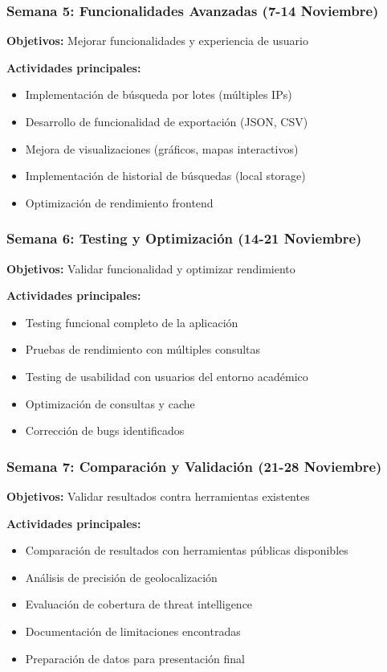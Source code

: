 \subsubsection{Semana 5: Funcionalidades Avanzadas (7-14 Noviembre)}
\textbf{Objetivos:} Mejorar funcionalidades y experiencia de usuario

\textbf{Actividades principales:}
\begin{itemize}
    \item Implementación de búsqueda por lotes (múltiples IPs)
    \item Desarrollo de funcionalidad de exportación (JSON, CSV)
    \item Mejora de visualizaciones (gráficos, mapas interactivos)
    \item Implementación de historial de búsquedas (local storage)
    \item Optimización de rendimiento frontend
\end{itemize}

\subsubsection{Semana 6: Testing y Optimización (14-21 Noviembre)}
\textbf{Objetivos:} Validar funcionalidad y optimizar rendimiento

\textbf{Actividades principales:}
\begin{itemize}
    \item Testing funcional completo de la aplicación
    \item Pruebas de rendimiento con múltiples consultas
    \item Testing de usabilidad con usuarios del entorno académico
    \item Optimización de consultas y cache
    \item Corrección de bugs identificados
\end{itemize}

\subsubsection{Semana 7: Comparación y Validación (21-28 Noviembre)}
\textbf{Objetivos:} Validar resultados contra herramientas existentes

\textbf{Actividades principales:}
\begin{itemize}
    \item Comparación de resultados con herramientas públicas disponibles
    \item Análisis de precisión de geolocalización
    \item Evaluación de cobertura de threat intelligence
    \item Documentación de limitaciones encontradas
    \item Preparación de datos para presentación final
\end{itemize}

